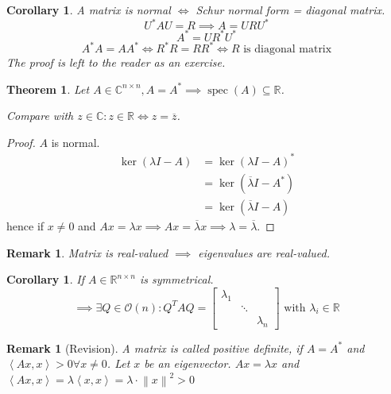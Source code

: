 \documentclass{article}
\newcounter{lecref}[section]
\numberwithin{lecref}{section}
\newtheorem{theorem}[lecref]{Theorem}
\newtheorem{remark}[lecref]{Remark}
\newtheorem{corollary}[lecref]{Corollary}
\newcommand{\angel}[1]{\left\langle#1\right\rangle}
\newcommand{\norm}[1]{\left\|#1\right\|}
\begin{document}
\begin{corollary}
  A matrix is normal $\iff$ Schur normal form = diagonal matrix.
  \[ U^* AU = R \implies A = URU^* \]
  \[ A^* = UR^* U^* \]
  \[ A^* A = AA^* \iff R^* R = RR^* \iff R \text{ is diagonal matrix} \]
  The proof is left to the reader as an exercise.
\end{corollary}

\begin{theorem} %
  Let $A \in \mathbb C^{n \times n}, A = A^* \implies \operatorname{spec}(A) \subseteq \mathbb R$.

  Compare with $z \in \mathbb C: z \in \mathbb R \iff z = \overline{z}$.
\end{theorem}

\begin{proof}
  $A$ is normal.
  \begin{align*}
    \ker(\lambda I - A) &= \ker(\lambda I - A)^* \\
      &= \ker(\overline{\lambda} I - A^*) \\
      &= \ker(\overline{\lambda} I - A)
  \end{align*}
  hence if $x \neq 0$ and $Ax = \lambda x \implies Ax = \overline{\lambda} x \implies \lambda = \overline\lambda$.
\end{proof}

\begin{remark}
  Matrix is real-valued $\implies$ eigenvalues are real-valued.
\end{remark}

\begin{corollary}
  If $A \in \mathbb R^{n \times n}$ is symmetrical.
  \[ \implies \exists Q \in \mathcal O(n): Q^T AQ = \begin{bmatrix} \lambda_1 & & \\ & \ddots & \\ & & \lambda_n \end{bmatrix} \text{ with } \lambda_i \in \mathbb R \]
\end{corollary}

\begin{remark}[Revision]
  A matrix is called positive definite, if $A = A^*$ and $\angel{Ax,x} > 0 \forall x \neq 0$.
  Let $x$ be an eigenvector. $Ax = \lambda x$ and $\angel{Ax,x} = \lambda \angel{x,x} = \lambda \cdot \norm{x}^2 > 0$
\end{remark}
\end{document}
